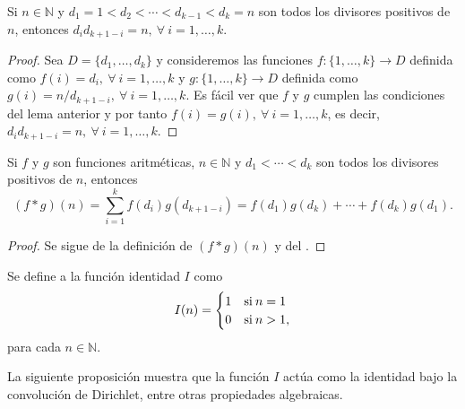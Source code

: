\begin{lemma}\label{lemma:div1}
Si $n\in\mathbb{N}$ y $d_1=1<d_2<\cdots<d_{k-1}<d_k=n$ son todos los divisores positivos de $n$, entonces $d_i d_{k+1-i}=n,\:\forall \: i=1,\ldots,k$.
\end{lemma}
\begin{proof}
Sea $D=\{d_1,\ldots,d_k\}$ y consideremos las funciones $f: \{1,\ldots,k\} \longrightarrow D$ definida como $f(i)=d_i,\:\forall \: i=1,\ldots,k$ y $g: \{1,\ldots,k\} \longrightarrow D$ definida como $g(i)=n/d_{k+1-i},\:\forall \: i=1,\ldots,k$. Es fácil ver que $f$ y $g$ cumplen las condiciones del lema anterior y por tanto $f(i)=g(i),\:\forall \: i=1,\ldots,k$, es decir, $d_i d_{k+1-i}=n,\:\forall \: i=1,\ldots,k$.
\end{proof}

\begin{proposition}\label{prop:dir1}
Si $f$ y $g$ son funciones aritméticas, $n\in\mathbb{N}$ y $d_1<\cdots<d_k$ son todos los divisores positivos de $n$, entonces 
\begin{equation*}
	(f*g)(n)=\sum_{i=1}^{k} f(d_i)g(d_{k+1-i})=f(d_1)g(d_k)+\cdots+f(d_k)g(d_1).
\end{equation*}
\begin{proof}
Se sigue de la definición de $(f*g)(n)$ y del .
\end{proof}
\end{proposition}

\begin{definition}\label{def:str2}
Se define a la función identidad $I$ como
\begin{equation*}
	I(n) =
		\begin{cases}
			\hfil 1 & \text{si} \: n=1 \\ 
			\hfil 0 & \text{si} \: n>1,
		\end{cases}
\end{equation*}
para cada $n\in\mathbb{N}$.
\end{definition}

La siguiente proposición muestra que la función $I$ actúa como la identidad bajo la convolución de Dirichlet, entre otras propiedades algebraicas.

